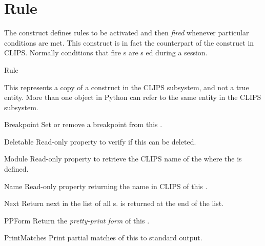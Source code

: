\section{Rule\label{pyclips-cl-Rule}}

The construct defines rules to be activated and then \emph{fired} whenever
particular conditions are met. This construct is in fact the counterpart
of the  construct in CLIPS. Normally conditions that fire
s are s ed during a session.

\begin{classdesc*}{Rule}

This represents a copy of a  construct in the CLIPS
subsystem, and not a true  entity. More than one
 object in Python can refer to the same 
entity in the CLIPS subsystem.

\begin{memberdesc}[property]{Breakpoint}
Set or remove a breakpoint from this .
\end{memberdesc}

\begin{memberdesc}[property]{Deletable}
Read-only property to verify if this  can be deleted.
\end{memberdesc}

\begin{memberdesc}[property]{Module}
Read-only property to retrieve the CLIPS name of the 
where the  is defined.
\end{memberdesc}

\begin{memberdesc}[property]{Name}
Read-only property returning the name in CLIPS of this .
\end{memberdesc}

\begin{methoddesc}{Next}{}
Return next  in the list of all s.  is
returned at the end of the list.
\end{methoddesc}

\begin{methoddesc}{PPForm}{}
Return the \emph{pretty-print form} of this .
\end{methoddesc}

\begin{methoddesc}{PrintMatches}{}
Print partial matches of this  to standard output.
\end{methoddesc}


\end{classdesc*}
